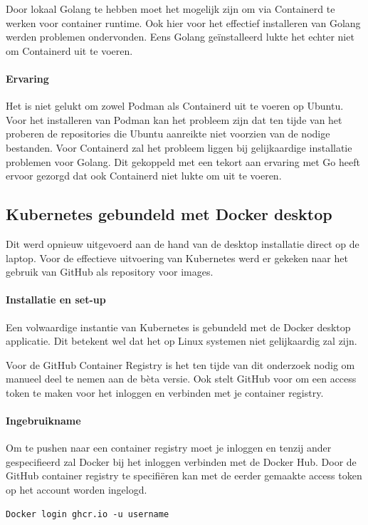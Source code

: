 Door lokaal Golang te hebben moet het mogelijk zijn om via Containerd te werken voor container runtime. Ook hier voor het effectief installeren van Golang werden problemen ondervonden.  Eens Golang geïnstalleerd lukte het echter niet om Containerd uit te voeren.


\paragraph{Ervaring}
Het is niet gelukt om zowel Podman als Containerd uit te voeren op Ubuntu. Voor het installeren van Podman kan het probleem zijn dat ten tijde van het proberen de repositories die Ubuntu aanreikte niet voorzien van de nodige bestanden. Voor Containerd zal het probleem liggen bij gelijkaardige installatie problemen voor Golang. Dit gekoppeld met een tekort aan ervaring met Go heeft ervoor gezorgd dat ook Containerd niet lukte om uit te voeren.

\subsection{Kubernetes gebundeld met Docker desktop}
Dit werd opnieuw uitgevoerd aan de hand van de desktop installatie direct op de laptop. Voor de effectieve uitvoering van Kubernetes werd er gekeken naar het gebruik van GitHub als repository voor images.
\paragraph{Installatie en set-up}
Een volwaardige instantie van Kubernetes is gebundeld met de Docker desktop applicatie. Dit betekent wel dat het op Linux systemen niet gelijkaardig zal zijn.

Voor de GitHub Container Registry is het ten tijde van dit onderzoek nodig om manueel deel te nemen aan de bèta versie. Ook stelt GitHub voor om een access token te maken voor het inloggen en verbinden met je container registry.

\paragraph{Ingebruikname}
Om te pushen naar een container registry moet je inloggen en tenzij ander gespecifieerd zal Docker bij het inloggen verbinden met de Docker Hub. Door de GitHub container registry te specifiëren kan met de eerder gemaakte access token op het account worden ingelogd.
\begin{verbatim}
Docker login ghcr.io -u username
\end{verbatim}

